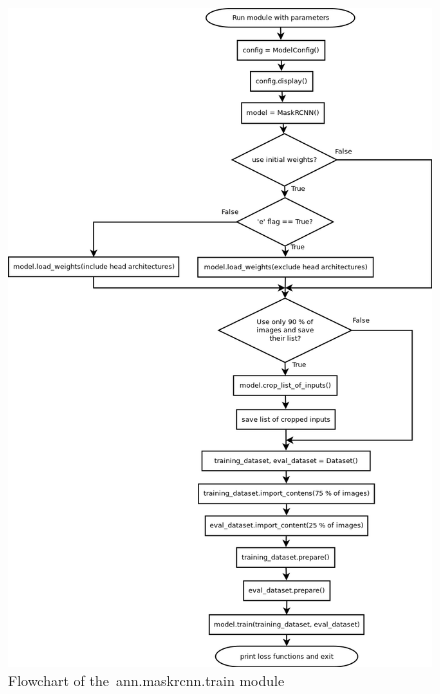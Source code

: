 \begin{figure}[H]
   \centering
	\includegraphics[width=0.95\linewidth]{./pictures/train_dia.png}
	\caption[ann.maskrcnn.train flowchart]{Flowchart of the~ann.maskrcnn.train module}
      \label{fig:train}
\end{figure}


